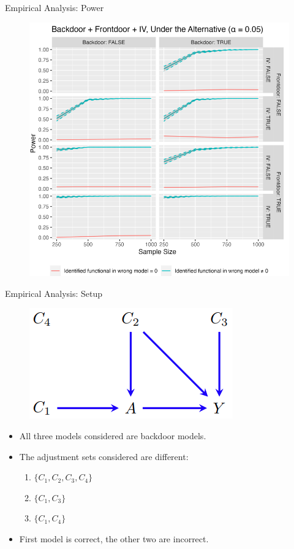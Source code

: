 \documentclass{beamer}
\begin{document}
\begin{frame}{Empirical Analysis: Power}
	\begin{figure}
		\center
		\includegraphics[scale=0.3]{power.png}
	\end{figure}
\end{frame}

\begin{frame}{Empirical Analysis: Setup}
	\begin{figure}
		\center
		\includegraphics[scale=0.3]{empirical_dag.png}
	\end{figure}
	\begin{itemize}
		\item All three models considered are backdoor models.
		\item The adjustment sets considered are different:
			\begin{enumerate}
				\item $ \{ C_1, C_2, C_3, C_4 \} $
				\item $ \{ C_1, C_3 \} $
				\item $ \{ C_1, C_4 \} $
			\end{enumerate}
		\item First model is correct, the other two are incorrect.
	\end{itemize}
\end{frame}
\end{document}
